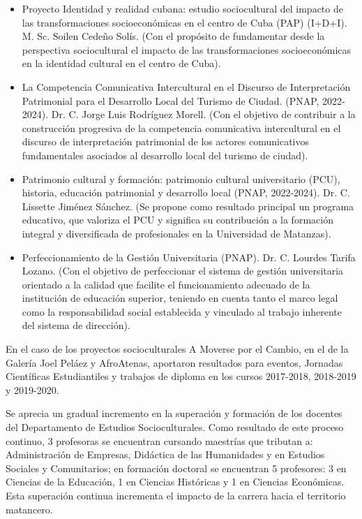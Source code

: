 \begin{itemize}
	\setlength\itemsep{-0.5em}
	\item Proyecto Identidad y realidad cubana: estudio sociocultural del impacto de las transformaciones socioeconómicas en el centro de Cuba (PAP) (I+D+I). M. Sc. Soilen Cedeño Solís. (Con el propósito de fundamentar desde la perspectiva sociocultural el impacto de las transformaciones socioeconómicas en la identidad cultural en el centro de Cuba).
	\item La Competencia Comunicativa Intercultural en el Discurso de Interpretación Patrimonial para el Desarrollo Local del Turismo de Ciudad. (PNAP, 2022-2024). Dr. C. Jorge Luis Rodríguez Morell. (Con el objetivo de contribuir a la construcción progresiva de la competencia comunicativa intercultural en el discurso de interpretación patrimonial de los actores comunicativos fundamentales asociados al desarrollo local del turismo de ciudad).
	\item Patrimonio cultural y formación: patrimonio cultural universitario (PCU), historia, educación patrimonial y desarrollo local (PNAP, 2022-2024). Dr. C. Lissette Jiménez Sánchez. (Se propone como resultado principal un programa educativo, que valoriza el PCU y significa su contribución a la formación integral y diversificada de profesionales en la Universidad de Matanzas).
	\item Perfeccionamiento de la Gestión Universitaria (PNAP). Dr. C. Lourdes Tarifa Lozano. (Con el objetivo de perfeccionar el sistema de gestión universitaria orientado a la calidad que facilite el funcionamiento adecuado de la institución de educación superior, teniendo en cuenta tanto el marco legal como la responsabilidad social establecida y vinculado al trabajo inherente del sistema de dirección).
\end{itemize}

En el caso de los proyectos socioculturales A Moverse por el Cambio, en el de la Galería Joel Peláez y AfroAtenas, aportaron resultados para eventos, Jornadas Científicas Estudiantiles y trabajos de diploma en los cursos 2017-2018, 2018-2019 y 2019-2020.

Se aprecia un gradual incremento en la superación y formación de los docentes del Departamento de Estudios Socioculturales. Como resultado de este proceso continuo, 3 profesoras se encuentran cursando maestrías que tributan a: Administración de Empresas, Didáctica de las Humanidades y en Estudios Sociales y Comunitarios; en formación doctoral se encuentran 5 profesores: 3 en Ciencias de la Educación, 1 en Ciencias Históricas y 1 en Ciencias Económicas. Esta superación continua incrementa el impacto de la carrera hacia el territorio matancero.

